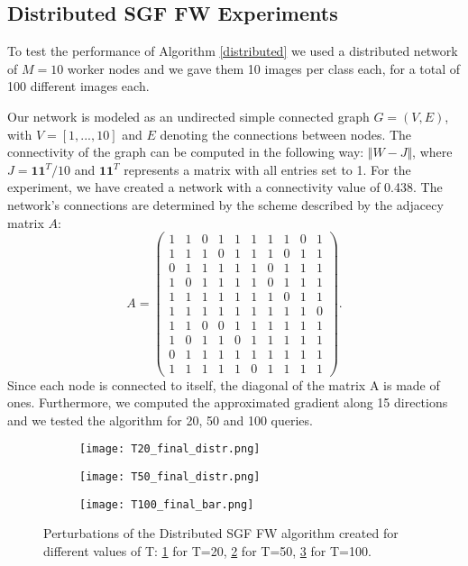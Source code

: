 \subsection{Distributed SGF FW Experiments}
To test the performance of Algorithm \ref{distributed} we used a distributed network of $M=10$ worker nodes and we
gave them 10 images per class each, for a total of 100 different images each.

Our network is modeled as an undirected simple connected graph $G = (V,E)$, with $V = [1,...,10]$ and $E$ denoting
the connections between nodes. The connectivity of the graph can be computed in the following way: $\Vert W- J \Vert$,
where $J= \mathbf{11}^T/10$ and $\mathbf{11}^T$ represents a matrix with all entries set to 1. For the experiment, we have created a network
with a connectivity value of 0.438. The network's connections are determined by the scheme described by the adjacecy
matrix $A$:
\[ A =
\begin{pmatrix}
1& 1& 0& 1& 1& 1& 1& 1& 0& 1\\
1& 1& 1& 0& 1& 1& 1& 0& 1& 1\\
0& 1& 1& 1& 1& 1& 0& 1& 1& 1\\
1& 0& 1& 1& 1& 1& 0& 1& 1& 1\\
1& 1& 1& 1& 1& 1& 1& 0& 1& 1\\
1& 1& 1& 1& 1& 1& 1& 1& 1& 0\\
1& 1& 0& 0& 1& 1& 1& 1& 1& 1\\
1& 0& 1& 1& 0& 1& 1& 1& 1& 1\\
0& 1& 1& 1& 1& 1& 1& 1& 1& 1\\
1& 1& 1& 1& 1& 0& 1& 1& 1& 1
\end{pmatrix}
.\]
Since each node is connected to itself, the diagonal of the matrix A is made of ones.
 Furthermore, we computed the approximated gradient along 15 directions and we tested
the algorithm for 20, 50 and 100 queries.

\begin{figure}%
	\centering
	\begin{subfigure}[b]{0.15\textwidth}
		\centering
		\texttt{[image: T20\_final\_distr.png]}
		\caption{}
		\label{fig:distributed_perturbation_20}
	\end{subfigure}
	\hfill
	\begin{subfigure}[b]{0.15\textwidth}
		\texttt{[image: T50\_final\_distr.png]}
		\caption{}
		\label{fig:variance-distributed_perturbation_50}
	\end{subfigure}
	\hfill
	\begin{subfigure}[b]{0.15\textwidth}
		\texttt{[image: T100\_final\_bar.png]}
		\caption{}
		\label{fig:distributed_perturbation_100}
	\end{subfigure}
	\caption{{\small Perturbations of the Distributed SGF FW algorithm created for different values of T:
	  \ref{fig:distributed_perturbation_20} for T=20, \ref{fig:variance-distributed_perturbation_50} for T=50, \ref{fig:distributed_perturbation_100} for T=100.}}
	\label{fig:perturbations}
\end{figure}

